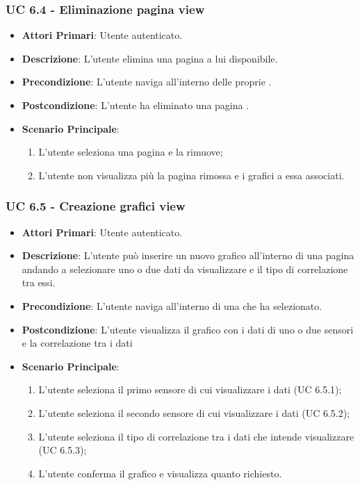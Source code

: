 			\subsubsection{UC 6.4 - Eliminazione pagina view}
			\begin{itemize}
				\item \textbf{Attori Primari}: Utente autenticato.
				\item \textbf{Descrizione}: L'utente elimina una pagina  a lui disponibile.
				\item \textbf{Precondizione}: L'utente naviga all'interno delle proprie .
				\item \textbf{Postcondizione}: L'utente ha eliminato una pagina .
				\item \textbf{Scenario Principale}:
				\begin{enumerate}
					\item L'utente seleziona una pagina  e la rimuove;
					\item L'utente non visualizza più la pagina  rimossa e i grafici a essa associati.
				\end{enumerate}	
			\end{itemize}

			\subsubsection{UC 6.5 - Creazione grafici view}
			\begin{itemize}
				\item \textbf{Attori Primari}: Utente autenticato.
				\item \textbf{Descrizione}: L'utente può inserire un nuovo grafico all'interno di una pagina  andando a selezionare uno o due dati da visualizzare e il tipo di correlazione tra essi.
				\item \textbf{Precondizione}: L'utente naviga all'interno di una  che ha selezionato.
				\item \textbf{Postcondizione}: L'utente visualizza il grafico con i dati di uno o due sensori e la correlazione tra i dati
				\item \textbf{Scenario Principale}:
				\begin{enumerate}
					\item{L'utente seleziona il primo sensore di cui visualizzare i dati (UC 6.5.1);}
					\item{L'utente seleziona il secondo sensore di cui visualizzare i dati (UC 6.5.2);}
					\item{L'utente seleziona il tipo di correlazione tra i dati che intende visualizzare (UC 6.5.3);}
					\item{L'utente conferma il grafico e visualizza quanto richiesto.}
				\end{enumerate}	
			\end{itemize}

